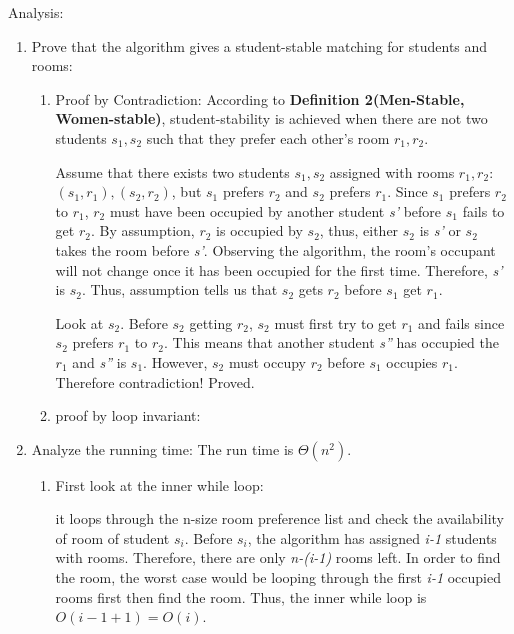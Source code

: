 \documentclass{homework}
\begin{document}
\begin{enumerate}
    Analysis:
    \begin{enumerate}
        \item Prove that the algorithm gives a student-stable matching for students and rooms:

        \begin{enumerate}
            \item Proof by Contradiction:
            According to \textbf{Definition 2(Men-Stable, Women-stable)}, student-stability is achieved when there are not two students \textit{$s_1, s_2$} such that they prefer each other's room \textit{$r_1, r_2$}.
        
            Assume that there exists two students \textit{$s_1, s_2$} assigned with rooms \textit{$r_1, r_2$}: \textit{$(s_1, r_1), (s_2, r_2)$}, but \textit{$s_1$} prefers \textit{$r_2$} and \textit{$s_2$} prefers \textit{$r_1$}. Since \textit{$s_1$} prefers \textit{$r_2$} to \textit{$r_1$}, \textit{$r_2$} must have been occupied by another student \textit{s'} before \textit{$s_1$} fails to get \textit{$r_2$}. By assumption, \textit{$r_2$} is occupied by \textit{$s_2$}, thus, either \textit{$s_2$} is \textit{s'} or \textit{$s_2$} takes the room before \textit{s'}. Observing the algorithm, the room's occupant will not change once it has been occupied for the first time. Therefore, \textit{s'} is \textit{$s_2$}. Thus, assumption tells us that \textit{$s_2$} gets \textit{$r_2$} before \textit{$s_1$} get \textit{$r_1$}.
        
            Look at \textit{$s_2$}. Before \textit{$s_2$} getting \textit{$r_2$}, \textit{$s_2$} must first try to get \textit{$r_1$} and fails since \textit{$s_2$} prefers \textit{$r_1$} to \textit{$r_2$}. This means that another student \textit{s''} has occupied the \textit{$r_1$} and \textit{s''} is \textit{$s_1$}. However, \textit{$s_2$} must occupy \textit{$r_2$} before \textit{$s_1$} occupies \textit{$r_1$}. Therefore contradiction! Proved.

            \item proof by loop invariant:
        \end{enumerate}
        

        \item Analyze the running time:
        The run time is $\Theta(n^2)$.
        \begin{enumerate}
            \item First look at the inner while loop:

            it loops through the n-size room preference list and check the availability of room of student \textit{$s_i$}. Before \textit{$s_i$}, the algorithm has assigned \textit{i-1} students with rooms. Therefore, there are only \textit{n-(i-1)} rooms left. In order to find the room, the worst case would be looping through the first \textit{i-1} occupied rooms first then find the room. Thus, the inner while loop is $O(i-1+1) = O(i)$.


\end{enumerate}
\end{enumerate}
\end{enumerate}
\end{document}
